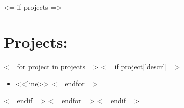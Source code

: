 \documentclass{resume}
\begin{document}
\begin{comment}

New section, trying it out
Currently canning this section but THAT'S OKAY
\section*{\underline{\textit{Projects:}}}
\large\textit{Super Four-Bar Explorer \hfill December 2008}\normalsize
\small\begin{itemize}
\item A program written in python that uses a Gauss-Newton unconstrained optimization algorithm to fit the path traced by a four bar linkage to a given set of points
\item Accompanied by a spreadsheet that illustrates four-bar linkage traced paths
\end{itemize}\normalsize\medskip

Another new section, recommended by Career Services. At worst, I have the
wording for it, amirite?
\section*{\underline{\textit{Service:}}}
\tiny\begin{enumerate}
\item Administered the web site and Facebook page for ASME's UAF student chapter \hfill 2009--2010
\item Volunteered at the UAF College of Engineering and Mines' Engineer's Week Open House \hfill February 2010
\end{enumerate}\normalsize

\large\textit{Society of Automotive Engineers, UAF
Chapter\hfill2009}\normalsize\\
\textit{Treasurer}
\end{comment}

<= if projects =>
    \section{Projects:}
    <= for project in projects =>
        <= if project['descr'] =>
            \small\begin{itemize}
            <= for line in project['descr'] =>
                \item <<line>>
            <= endfor =>
            \end{itemize}\normalsize
        <= endif =>
    <= endfor =>
<= endif =>
\end{document}
